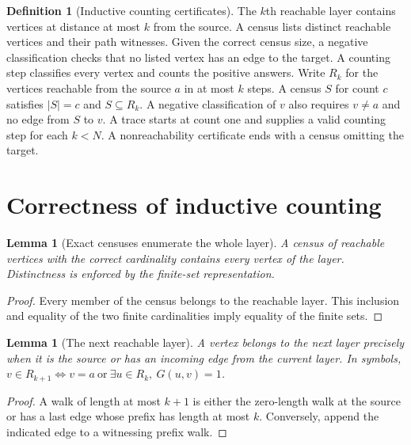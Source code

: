 \documentclass[11pt]{article}
\newtheorem{lemma}[theorem]{Lemma}
\theoremstyle{definition}
\newtheorem{definition}[theorem]{Definition}
\begin{document}
\begin{definition}[Inductive counting certificates]\leavevmode
The $k$th reachable layer contains vertices at distance at most $k$ from the
source. A census lists distinct reachable vertices and their path witnesses.
Given the correct census size, a negative classification checks that no
listed vertex has an edge to the target. A counting step classifies every
vertex and counts the positive answers.
Write $R_k$ for the vertices reachable from the source $a$ in at most $k$ steps. A census $S$ for count $c$ satisfies $|S|=c$ and $S\subseteq R_k$. A negative classification of $v$ also requires $v\ne a$ and no edge from $S$ to $v$. A trace starts at count one and supplies a valid counting step for each $k<N$. A nonreachability certificate ends with a census omitting the target.
\end{definition}

\section{Correctness of inductive counting}

\begin{lemma}[Exact censuses enumerate the whole layer]\leavevmode
A census of reachable vertices with the correct cardinality contains every
vertex of the layer. Distinctness is enforced by the finite-set representation.

\end{lemma}
\begin{proof}\leavevmode
Every member of the census belongs to the reachable layer. This inclusion and equality of the two finite cardinalities imply equality of the finite sets.\qedhere
\end{proof}

\begin{lemma}[The next reachable layer]\leavevmode
A vertex belongs to the next layer precisely when it is the source or has
an incoming edge from the current layer.
In symbols, $v\in R_{k+1}\Longleftrightarrow v=a\ \text{or}\ \exists u\in R_k,\ G(u,v)=1$.
\end{lemma}
\begin{proof}\leavevmode
A walk of length at most $k+1$ is either the zero-length walk at the source or has a last edge whose prefix has length at most $k$. Conversely, append the indicated edge to a witnessing prefix walk.\qedhere
\end{proof}
\end{document}
